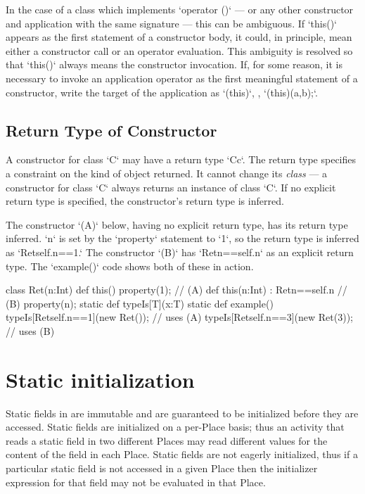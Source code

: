 In the case of a class which implements \xcd`operator ()` 
--- or any other constructor and application with the same signature --- 
this can be ambiguous.  If \xcd`this()` appears as the first statement of a
constructor body, it could, in principle, mean either a constructor call or an
operator evaluation.   This ambiguity is resolved so that \xcd`this()` always
means the constructor invocation.  If, for some reason, it is necessary to
invoke an application operator as the first meaningful statement of a
constructor, write the target of the application as \xcd`(this)`, \eg,
\xcd`(this)(a,b);`. 

\subsection{Return Type of Constructor}

A constructor for class \xcd`C` may have a return type \xcd`C{c}`.  The return
type specifies a constraint on the kind of object returned.  It cannot change
its {\em class} --- a constructor for class \xcd`C` always returns an instance
of class \xcd`C`.  
If no explicit return type is specified, the constructor's return type is
inferred.

\begin{ex}
The constructor \xcd`(A)` below, having no explicit return type, 
has its return type inferred.  
\xcd`n` is set by the \xcd`property` statement to \xcd`1`, so the return type
is inferred as \xcd`Ret{self.n==1}.`
The constructor \xcd`(B)` has \xcd`Ret{n==self.n}` as an explicit return type.
The \xcd`example()` code shows both of these in action.

\begin{xten}
class Ret(n:Int) {
   def this()    { property(1); }     // (A)
   def this(n:Int) : Ret{n==self.n} { // (B)
      property(n);
   }
   static def typeIs[T](x:T){}
   static def example() {
     typeIs[Ret{self.n==1}](new Ret());  // uses (A)
     typeIs[Ret{self.n==3}](new Ret(3)); // uses (B)
   }
}
\end{xten}
%


\end{ex}

\section{Static initialization}
\label{StaticInitialization}
Static fields in \Xten{} are immutable and are guaranteed to be
initialized before they are accessed. Static fields are initialized on
a per-Place basis; thus an activity that reads a static field in two
different Places may read different values for the content of the
field in each Place.  Static fields are not eagerly initialized, thus
if a particular static field is not accessed in a given Place then the
initializer expression for that field may not be evaluated in that
Place.

